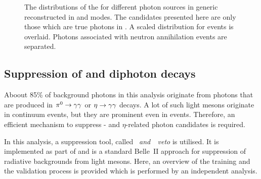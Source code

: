 \begin{figure}[hbtp!]
    \centering
    \caption{\label{fig:zmva_distribution_sources} The distributions of the \ZMVA for different photon sources in generic \MC reconstructed in \feiBp and \feiBz modes.
    The candidates presented here are only those which are true photons in .
    A scaled \ZMVA distribution for \BtoXsgamma events is overlaid.
    Photons associated with neutron annihilation events are separated.}
\end{figure}

\subsection{Suppression of \texorpdfstring{\piz}{pi0} and \texorpdfstring{\eta}{eta} diphoton decays}\label{sec:selection_vetos}

Aboout 85\% of background photons in this analysis originate from photons that are produced in $\pi^0\rightarrow\gamma\gamma$ or $\eta\rightarrow\gamma\gamma$ decays.
A lot of such light mesons originate in continuum events, but they are prominent even in \BB events.
Therefore, an efficient mechanism to suppress \piz- and $\eta$-related photon candidates is required.

In this analysis, a suppression tool, called \textit{\piz~and~\eta~veto} is utilised.
It is implemented as part of \basftwo and is a standard Belle~II approach for suppression of radiative backgrounds from light mesons.
Here, an overview of the training and the validation process is provided which is performed by an independent analysis.

